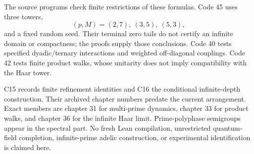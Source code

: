 The source programs check finite restrictions of these formulas. Code 45
uses three towers,
\[
 (p,M)=(2,7),\ (3,5),\ (5,3),
\]
and a fixed random seed. Their terminal zero tails do not certify an
infinite domain or compactness; the proofs supply those conclusions.
Code 40 tests specified dyadic/ternary interactions and weighted
off-diagonal couplings. Code 42 tests finite product walks, whose
unitarity does not imply compatibility with the Haar tower.

C15 records finite refinement identities and C16 the conditional
infinite-depth construction. Their archived chapter numbers predate the
current arrangement. Exact members are chapter 31 for multi-prime
dynamics, chapter 33 for product walks, and chapter 36 for the infinite
Haar limit. Prime-polyphase semigroups appear in the spectral part.
No fresh Lean compilation, unrestricted quantum-field completion,
infinite-prime adelic construction, or experimental identification is
claimed here.
